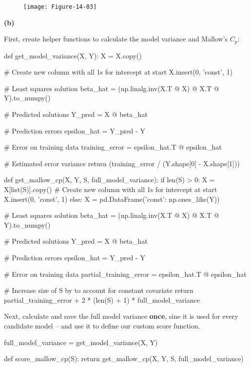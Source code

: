 \begin{figure}[H]
\centering
\texttt{[image: Figure-14-03]}
\end{figure}

\textbf{(b)}

First,  create helper functions to calculate the model variance and
Mallow's \(C_p\):

\begin{python}
def get_model_variance(X, Y):
    X = X.copy()
    
    # Create new column with all 1s for intercept at start
    X.insert(0, 'const', 1)
    
    # Least squares solution
    beta_hat = (np.linalg.inv(X.T @ X) @ X.T @ Y).to_{n}umpy()

    # Predicted solutions
    Y_pred = X @ beta_hat

    # Prediction errors
    epsilon_hat = Y_pred - Y

    # Error on training data
    training_error = epsilon_hat.T @ epsilon_hat
    
    # Estimated error variance
    return (training_error / (Y.shape[0] - X.shape[1]))
    

def get_mallow_cp(X, Y, S, full_model_variance):
    if len(S) > 0:
        X = X[list(S)].copy()
        # Create new column with all 1s for intercept at start
        X.insert(0, 'const', 1)
    else:
        X = pd.DataFrame({'const': np.ones_like(Y)})
    
    # Least squares solution
    beta_hat = (np.linalg.inv(X.T @ X) @ X.T @ Y).to_{n}umpy()

    # Predicted solutions
    Y_pred = X @ beta_hat

    # Prediction errors
    epsilon_hat = Y_pred - Y

    # Error on training data
    partial_training_error = epsilon_hat.T @ epsilon_hat
    
    # Increase size of S by to account for constant covariate
    return partial_training_error + 2 * (len(S) + 1) * full_model_variance
\end{python}

Next,  calculate and save the full model variance \textbf{once},
sine it is used for every candidate model -- and use it to define our
custom score function.

\begin{python}
full_model_variance = get_model_variance(X, Y)

def score_mallow_cp(S):
    return get_mallow_cp(X, Y, S, full_model_variance)
\end{python}


